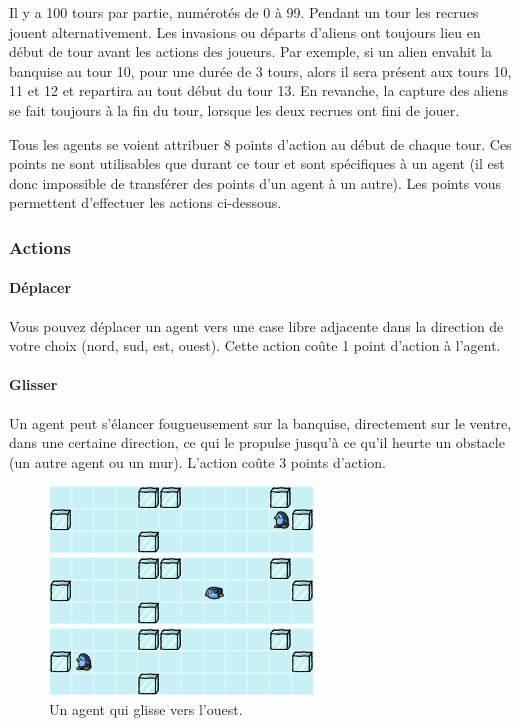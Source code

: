 Il y a 100 tours par partie, numérotés de 0 à 99. Pendant un tour les
recrues jouent alternativement. Les invasions ou départs d'aliens ont
toujours lieu en début de tour avant les actions des joueurs. Par
exemple, si un alien envahit la banquise au tour 10, pour une durée de 3
tours, alors il sera présent aux tours 10, 11 et 12 et repartira au tout
début du tour 13. En revanche, la capture des aliens se fait toujours à
la fin du tour, lorsque les deux recrues ont fini de jouer.

Tous les agents se voient attribuer 8 points d'action au début de chaque
tour. Ces points ne sont utilisables que durant ce tour et sont
spécifiques à un agent (il est donc impossible de transférer des points
d'un agent à un autre). Les points vous permettent d'effectuer les
actions ci-dessous.

\subsubsection{Actions}\label{actions}

\paragraph{Déplacer}\label{duxe9placer}

Vous pouvez déplacer un agent vers une case libre adjacente dans la
direction de votre choix (nord, sud, est, ouest). Cette action coûte 1
point d'action à l'agent.

\paragraph{Glisser}\label{glisser}

Un agent peut s'élancer fougueusement sur la banquise, directement sur
le ventre, dans une certaine direction, ce qui le propulse jusqu'à ce
qu'il heurte un obstacle (un autre agent ou un mur). L'action coûte 3
points d'action.

\begin{figure}[!h]
    \centering
    \includegraphics[width=7cm]{img/slide1}

    \vspace{0.5cm}
    \includegraphics[width=7cm]{img/slide2}

    \vspace{0.5cm}
    \includegraphics[width=7cm]{img/slide3}

    \caption*{Un agent qui glisse vers l'ouest.}
\end{figure}

